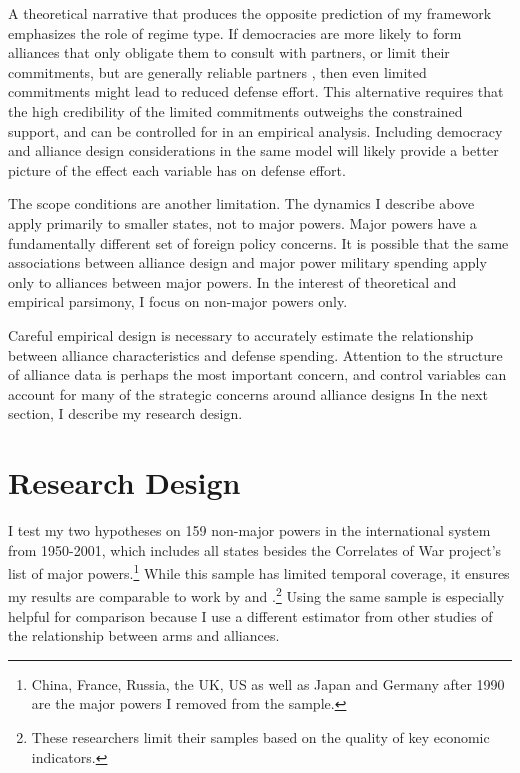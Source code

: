 \documentclass[12pt]{article}
\begin{document}
A theoretical narrative that produces the opposite prediction of my framework emphasizes the role of regime type. If democracies are more likely to form alliances that only obligate them to consult with partners, or limit their commitments, but are generally reliable partners \citep{Chibaetal2015, DigiuseppePoast2016}, then even limited commitments might lead to reduced defense effort. This alternative requires that the high credibility of the limited commitments outweighs the constrained support, and can be controlled for in an empirical analysis. Including democracy and alliance design considerations in the same model will likely provide a better picture of the effect each variable has on defense effort. 

The scope conditions are another limitation. The dynamics I describe above apply primarily to smaller states, not to major powers. Major powers have a fundamentally different set of foreign policy concerns. It is possible that the same associations between alliance design and major power military spending apply only to alliances between major powers. In the interest of theoretical and empirical parsimony, I focus on non-major powers only. 

Careful empirical design is necessary to accurately estimate the relationship between alliance characteristics and defense spending. Attention to the structure of alliance data is perhaps the most important concern, and control variables can account for many of the strategic concerns around alliance designs In the next section, I describe my research design. 
 

\section*{Research Design} 

I test my two hypotheses on 159 non-major powers in the international system from 1950-2001, which includes all states besides the Correlates of War project's list of major powers.\footnote{China, France, Russia, the UK, US as well as Japan and Germany after 1990 are the major powers I removed from the sample.} While this sample has limited temporal coverage, it ensures my results are comparable to work by \citet{DigiuseppePoast2016} and \citet{Nordhausetal2012}.\footnote{These researchers limit their samples based on the quality of key economic indicators.} Using the same sample is especially helpful for comparison because I use a different estimator from other studies of the relationship between arms and alliances. 
\end{document}
